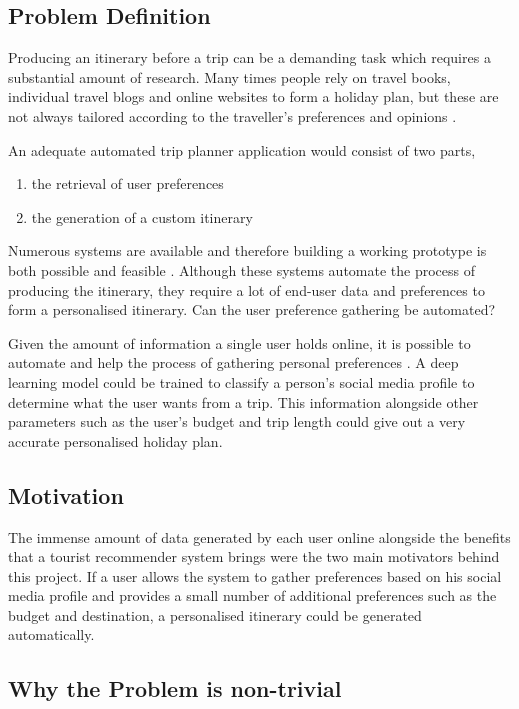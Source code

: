 \subsection{Problem Definition}

        Producing an itinerary before a trip can be a demanding task
        which requires  a substantial amount of  research. Many times
        people rely on travel books, individual travel blogs and online
        websites to form a holiday plan, but these are not always tailored according 
        to the traveller’s preferences and opinions \cite{DeChoudhury2010}. 

        An adequate automated trip planner application would consist
        of two parts, 
        
        \begin{enumerate}
                \item the retrieval of user preferences 
                \item the generation of a custom itinerary
        \end{enumerate}
        Numerous systems are available and 
        therefore building a working prototype is both possible and feasible 
        \cite{Sylejmani2017,Chang2016,Sylejmani2012,Sebastia2009a,Tumas2009,
        Vansteenwegen2011,Kurata2013, RamalhoBrilhante2014, 
        DeChoudhury2010,DUNSTALL2008a, DiBitonto2010a,Gavalas }. 
        Although these systems automate the process of producing the 
        itinerary, they require a lot of end-user data and preferences 
        to form a personalised itinerary. Can the user preference 
        gathering be automated?

        Given the amount of information a single user holds online, 
        it is possible to automate and help the process of 
        gathering personal preferences \cite{Buraya2017}. A deep 
        learning model could be trained to classify a person's social
        media profile to determine what the user wants from a trip. 
        This information alongside other parameters such as the user's
        budget and trip length could give out a very accurate 
        personalised holiday plan.

\subsection{Motivation}
        The immense amount of data generated by each user online \cite{J.Clement2020} 
        alongside the benefits that a tourist recommender system brings 
        were the two main motivators behind this project. If a user allows 
        the system to gather preferences based on his social media profile
        and provides a small number of additional preferences such as
        the budget and destination, a personalised itinerary could be
        generated automatically.
\subsection{Why the Problem is non-trivial}